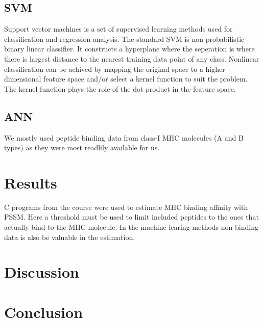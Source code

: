 \documentclass{bioinfo}
\begin{document}
\begin{application}
\subsection*{SVM}
Support vector machines is a set of supervised learning methods used for classification and regression analysis. The standard SVM is non-probabilistic binary linear classifier. It constructs a hyperplane where the seperation is where there is largest distance to the nearest training data point of any class. Nonlinear classification can be achived by  mapping the original space to a higher dimensional feature space and/or select a kernel function to suit the problem. The kernel function plays the role of the dot product in the feature space.

\subsection*{ANN}
We mostly used peptide binding data from class-I MHC molecules (A and B types) as they were most readlily available for us.

\section*{Results}
   
C programs from the course were used to estimate MHC binding affinity with PSSM. 
Here a threshold must be used to limit included peptides to the ones that actually bind to the MHC molecule. 
In the machine learing methods non-binding data is also be valuable in the estimation.


\section*{Discussion}
   

\section*{Conclusion}
   
\newpage





%
%
%
%
%






\end{application}
\end{document}
